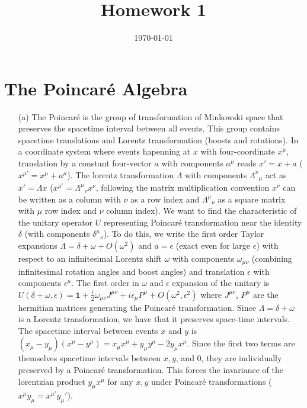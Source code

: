 \documentclass[10pt, a4paper]{article}
\title{Homework 1} %
\author{\PA} %
\date{\today} %
\begin{document}
\maketitlepage

\maketableofcontents


\section{The Poincaré Algebra}
\begin{enumerate}
  \item[(a)] The Poincaré is the group of transformation of Minkowski space that preserves the spacetime interval between all events. This group contains spacetime translations and Lorentz transformation (boosts and rotations). In a coordinate system where events hapenning at $x$ with four-coordinate $x^{\mu}$, translation by a constant four-vector $a$ with components  $a^\mu$ reads $x' = x + a$ ($x^{\mu'} = x^{\mu} + a^{\mu}$). The lorentz transformation $\Lambda$ with components $\Lambda^{\nu}{}_{\mu}$ act as $x' = \Lambda x$ ($x^{\mu'} = \Lambda^{\mu}{}_{\nu} x^{\nu}$, following the matrix multiplication convention $x^\nu$ can be written as a column with $\nu$ as a row index and $\Lambda^{\mu}{}_{\nu}$ as a square matrix with $\mu$ row index and $\nu$ column index). We want to find the characteristic of the unitary operator $U$ representing Poincaré transformation near the identity $\delta$ (with components $\delta^{\mu}{}_{\nu}$). To do this, we write the first order Taylor expansions $\Lambda = \delta + \omega + O(\omega^2)$ and $a = \epsilon$ (exact even for large $\epsilon$) with respect to an infinitesimal Lorentz shift $\omega$ with components $\omega_{\mu \nu}$ (combining infinitesimal rotation angles and boost angles) and translation $\epsilon$ with components $\epsilon^\mu$. The first order in $\omega$ and $\epsilon$ expansion of the unitary is $U(\delta+\omega, \epsilon)=\mathbf{1}+\frac{i}{2} \omega_{\mu \nu} J^{\mu \nu}+i \epsilon_\mu P^\mu + O(\omega^2, \epsilon^2)$ where $J^{\mu \nu}$, $P^\mu$ are the hermitian matrices generating the Poincaré transformation. Since $\Lambda = \delta + \omega$ is a Lorentz transformation, we have that it preserves space-time intervals. The spacetime interval between events $x$ and $y$ is $(x_\mu-y_\mu)(x^\mu-y^\mu) = x_\mu x^\mu + y_\mu y^\mu - 2 y_\mu x^\mu $. Since the first two terms are themselves spacetime intervals between $x, y$, and $0$, they are individually preserved by a Poincaré transformation. This forces the invariance of the lorentzian product $y_\mu x^\mu$ for any $x, y$ under Poincaré transformations ($x^\mu y_\mu = x^{\mu'} y_\mu'$).
  

\end{enumerate}
\end{document}

